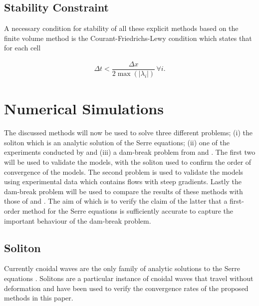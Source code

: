 \documentclass[SingleSpace,12pt,Proceedings]{Serre_ASCE}
\begin{document}
\subsection{Stability Constraint} %
A necessary condition for stability of all these explicit methods based on the finite volume method is the Courant-Friedrichs-Lewy condition \cite{Courant-etal-1928-32} which states that for each cell
\begin{linenomath*}
\begin{gather} \label{eq:CFLcond}
\Delta t < \dfrac{\Delta x}{2 \max\left(\left|\lambda_i\right|\right)} \, \forall i .
\end{gather}
\end{linenomath*} 
\section{Numerical Simulations}
\label{section:Numerical Simulations}
The discussed methods will now be used to solve three different problems; (i) the soliton which is an analytic solution of the Serre equations; (ii) one of the experiments conducted by  and (iii) a dam-break problem from  and . The first two will be used to validate the models, with the soliton used to confirm the order of convergence of the models. The second problem is used to validate the models using experimental data which contains flows with steep gradients. Lastly the dam-break problem will be used to compare the results of these methods with those of  and . The aim of which is to verify the claim of the latter that a first-order method for the Serre equations is sufficiently accurate to capture the important behaviour of the dam-break problem. 
\subsection{Soliton}
\label{section:Convergence Rate}
Currently cnoidal waves are the only family of analytic solutions to the Serre equations \cite{Carter-Cienfuegos-2010-259}. Solitons are a particular instance of cnoidal waves that travel without deformation and have been used to verify the convergence rates of the proposed methods in this paper. 
\end{document}
